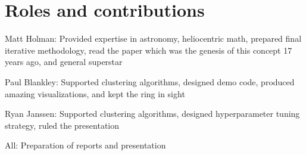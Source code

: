 \documentclass[11pt,letter]{article}
\begin{document}
\newpage
\section*{Roles and contributions}
Matt Holman: Provided expertise in astronomy, heliocentric math, prepared final iterative methodology, read the paper which was the genesis of this concept 17 years ago, and general superstar


\noindent
Paul Blankley: Supported clustering algorithms, designed demo code, produced amazing visualizations, and kept the ring in sight

\noindent
Ryan Janssen: Supported clustering algorithms, designed hyperparameter tuning strategy, ruled the presentation

\noindent
All: Preparation of reports and presentation
\end{document}

